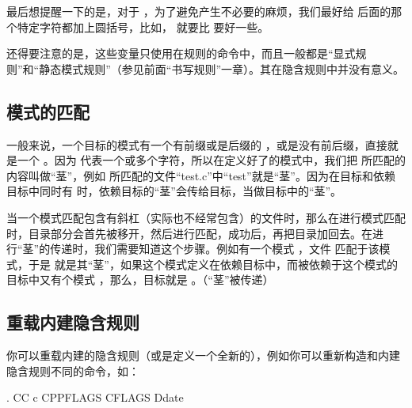\documentclass[a4paper,10pt]{sphinxmanual}
\begin{document}
最后想提醒一下的是，对于 \sphinxcode{\sphinxupquote{\$\textless{}}} ，为了避免产生不必要的麻烦，我们最好给 \sphinxcode{\sphinxupquote{\$}} 后面的那个特定字符都加上圆括号，比如， \sphinxcode{\sphinxupquote{\$(\textless{})}} 就要比 \sphinxcode{\sphinxupquote{\$\textless{}}} 要好一些。

还得要注意的是，这些变量只使用在规则的命令中，而且一般都是“显式规则”和“静态模式规则”（参见前面“书写规则”一章）。其在隐含规则中并没有意义。


\subsection{模式的匹配}
\label{\detokenize{implicit_rules:id12}}
一般来说，一个目标的模式有一个有前缀或是后缀的 \sphinxcode{\sphinxupquote{\%}} ，或是没有前后缀，直接就是一个 \sphinxcode{\sphinxupquote{\%}} 。因为 \sphinxcode{\sphinxupquote{\%}} 代表一个或多个字符，所以在定义好了的模式中，我们把 \sphinxcode{\sphinxupquote{\%}} 所匹配的内容叫做“茎”，例如
 所匹配的文件“test.c”中“test”就是“茎”。因为在目标和依赖目标中同时有 \sphinxcode{\sphinxupquote{\%}} 时，依赖目标的“茎”会传给目标，当做目标中的“茎”。

当一个模式匹配包含有斜杠（实际也不经常包含）的文件时，那么在进行模式匹配时，目录部分会首先被移开，然后进行匹配，成功后，再把目录加回去。在进行“茎”的传递时，我们需要知道这个步骤。例如有一个模式
 ，文件  匹配于该模式，于是  就是其“茎”，如果这个模式定义在依赖目标中，而被依赖于这个模式的目标中又有个模式  ，那么，目标就是  。（“茎”被传递）


\subsection{重载内建隐含规则}
\label{\detokenize{implicit_rules:id13}}
你可以重载内建的隐含规则（或是定义一个全新的），例如你可以重新构造和内建隐含规则不同的命令，如：

\begin{sphinxVerbatim}[commandchars=\\\{\}]
 \PYGZpc{}.
    CC \PYGZhy{}c CPPFLAGS CFLAGS \PYGZhy{}Ddate
\end{sphinxVerbatim}
\end{document}
